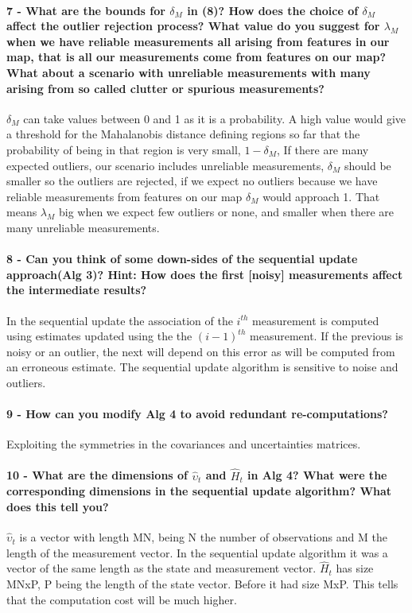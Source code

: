 \documentclass[12pt]{article}
\begin{document}
\paragraph{7 - What are the bounds for \(\delta_M\)  in (8)? How does the choice of \(\delta_M\) affect the outlier rejection process? What value do you suggest for \(\lambda_M\) when we have reliable measurements all arising from features in our map, that is all our measurements come from features on our map? What about a scenario with unreliable measurements with many arising from so called clutter or spurious measurements?}
\(\delta_M\) can take values between 0 and 1 as it is a probability. 
A high value would give a threshold for the Mahalanobis distance defining regions so far that the probability of being in that region  is very small, \(1-\delta_M\), If there are many expected outliers, our scenario includes unreliable measurements, \(\delta_M\) should be smaller so the outliers are rejected, if we expect no outliers because we have reliable measurements from features on our map \(\delta_M\) would approach 1. That means \(\lambda_M\) big when we expect few outliers or none, and smaller when there are many unreliable measurements.


\paragraph{8 - Can you think of some down-sides of the sequential update approach(Alg 3)? Hint: How does the first [noisy] measurements affect the intermediate results?}
In the sequential update the association of the \(i^{th}\) measurement is computed using estimates updated using the the \((i-1)^{th}\) measurement. If the previous is noisy or an outlier, the next will depend on this error as will be computed from an erroneous estimate. The sequential update algorithm is sensitive to noise and outliers.

\paragraph{9 - How can you modify Alg 4 to avoid redundant re-computations?}
Exploiting the symmetries in the covariances and uncertainties matrices.


\paragraph{10 - What are the dimensions of \(\hat{\upsilon}_t\) and \(\hat{H}_t\) in Alg 4? What were the corresponding dimensions in the sequential update algorithm? What does this tell you?}
\(\hat{\upsilon}_t\) is a vector with length MN, being N the number of observations and M the length of the measurement vector. In the sequential update algorithm it was a vector of the same length as the state and measurement vector. \(\hat{H}_t\) has size MNxP, P being the length of the state vector. Before it had size MxP. This tells that the computation cost will be much higher.
\end{document}
